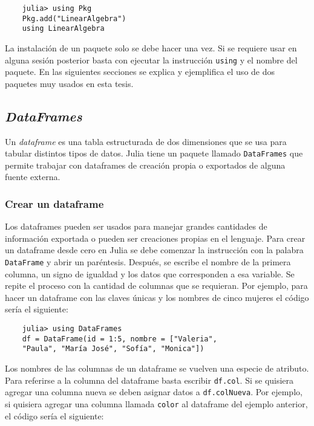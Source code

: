 \begin{verbatim}
	julia> using Pkg
	Pkg.add("LinearAlgebra")
	using LinearAlgebra
\end{verbatim}

La instalación de un paquete solo se debe hacer una vez. Si se requiere usar en alguna sesión posterior basta con ejecutar la instrucción \texttt{using} y el nombre del paquete. En las siguientes secciones se explica y ejemplifica el uso de dos paquetes muy usados en esta tesis. 

\subsection{\textit{DataFrames}}

Un \textit{dataframe} es una tabla estructurada de dos dimensiones que se usa para tabular distintos tipos de datos. \textsf{Julia} tiene un paquete llamado \texttt{DataFrames} que permite trabajar con dataframes de creación propia o exportados de alguna fuente externa. 

\subsubsection{Crear un dataframe}

Los dataframes pueden ser usados para manejar grandes cantidades de información exportada o pueden ser creaciones propias en el lenguaje. Para crear un dataframe desde cero en \textsf{Julia} se debe comenzar la instrucción con la palabra \texttt{DataFrame} y abrir un paréntesis. Después, se escribe el nombre de la primera columna, un signo de igualdad y los datos que corresponden a esa variable. Se repite el proceso con la cantidad de columnas que se requieran. Por ejemplo, para hacer un dataframe con las claves únicas y los nombres de cinco mujeres el código sería el siguiente: 


\begin{verbatim}
	julia> using DataFrames
	df = DataFrame(id = 1:5, nombre = ["Valeria", 
	"Paula", "María José", "Sofía", "Monica"])
\end{verbatim}

Los nombres de las columnas de un dataframe se vuelven una especie de atributo. Para referirse a la columna  del dataframe  basta escribir \texttt{df.col}. Si se quisiera agregar una columna nueva se deben asignar datos a \texttt{df.colNueva}. Por ejemplo, si quisiera agregar una columna llamada \texttt{color} al dataframe del ejemplo anterior, el código sería el siguiente: 

